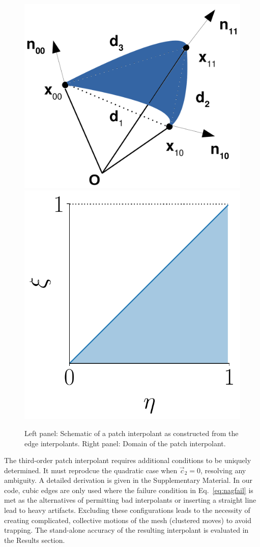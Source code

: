 \documentclass[twocolumn]{biophys-new}
\begin{document}
\begin{figure}[hbt]
\centering
\includegraphics[width=0.5\linewidth]{fig/schema_f.png}
\includegraphics[width=0.39\linewidth]{fig/domain}
\caption{Left panel: Schematic of a patch interpolant as constructed from the edge interpolants. Right panel: Domain of the patch interpolant.}
\label{fig:patch}
\end{figure}

The third-order patch interpolant requires additional conditions to be uniquely determined. It must reprodcue the quadratic case when $\vec{c}_2 = 0$, resolving any ambiguity. A detailed derivation is given in the Supplementary Material. In our code, cubic edges are only used where the failure condition in Eq.~\eqref{eq:nagfail} is met as the alternatives of permitting bad interpolants or inserting a straight line lead to heavy artifacts. Excluding these configurations leads to the necessity of creating complicated, collective motions of the mesh (clustered moves) to avoid trapping. The stand-alone accuracy of the resulting interpolant is evaluated in the Results section.
\end{document}
